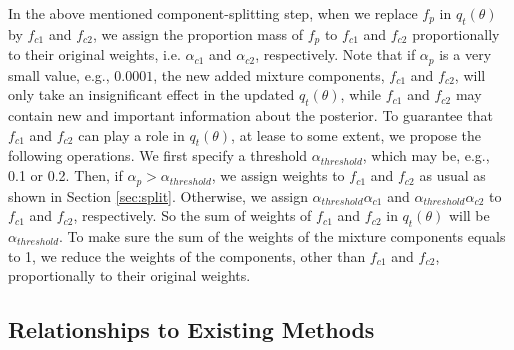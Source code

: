 \documentclass[aoas]{imsart}
\begin{document}
In the above mentioned component-splitting step, when we replace
$f_p$ in $q_t(\theta)$ by $f_{c1}$ and $f_{c2}$, we assign the
proportion mass of $f_p$ to $f_{c1}$ and $f_{c2}$ proportionally to
their original weights, i.e. $\alpha_{c1}$ and $\alpha_{c2}$,
respectively. Note that if $\alpha_p$ is a very small value, e.g.,
$0.0001$, the new added mixture components, $f_{c1}$ and $f_{c2}$,
will only take an insignificant effect in the updated $q_t(\theta)$,
while $f_{c1}$ and $f_{c2}$ may contain new and important
information about the posterior. To guarantee that $f_{c1}$ and
$f_{c2}$ can play a role in $q_t(\theta)$, at lease to some extent,
we propose the following operations. We first specify a threshold
$\alpha_{threshold}$, which may be, e.g., 0.1 or 0.2. Then, if
$\alpha_p>\alpha_{threshold}$, we assign weights to $f_{c1}$ and
$f_{c2}$ as usual as shown in Section \ref{sec:split}. Otherwise, we
assign $\alpha_{threshold}\alpha_{c1}$ and
$\alpha_{threshold}\alpha_{c2}$ to $f_{c1}$ and $f_{c2}$,
respectively. So the sum of weights of $f_{c1}$ and $f_{c2}$ in
$q_t(\theta)$ will be $\alpha_{threshold}$. To make sure the sum of
the weights of the mixture components equals to 1, we reduce the
weights of the components, other than $f_{c1}$ and $f_{c2}$,
proportionally to their original weights.

\subsection{Relationships to Existing Methods}
\end{document}
